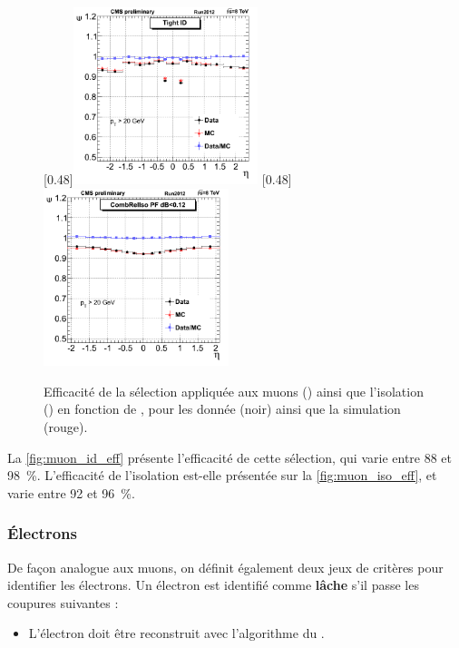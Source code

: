 \begin{figure}[tbp] \centering
    \subcaptionbox{\label{fig:muon_id_eff}}[0.48\textwidth]{\includegraphics[width=0.48\textwidth]{chapitre7/figs/muon_id_efficiency.png}} \hfill
    \subcaptionbox{\label{fig:muon_iso_eff}}[0.48\textwidth]{\includegraphics[width=0.48\textwidth]{chapitre7/figs/muon_iso_efficiency.png}}
    \caption{Efficacité de la sélection appliquée aux muons () ainsi que l'isolation () en fonction de \aeta, pour les donnée (noir) ainsi que la simulation (rouge).}
\end{figure}

La \cref{fig:muon_id_eff} présente l'efficacité de cette sélection, qui varie entre \num{88} et \SI{98}{\%}. L'efficacité de l'isolation est-elle présentée sur la \cref{fig:muon_iso_eff}, et varie entre \num{92} et \SI{96}{\%}.

\subsubsection{Électrons} \label{sec:sel_electron}


De façon analogue aux muons, on définit également deux jeux de critères pour identifier les électrons. Un électron est identifié comme \textbf{lâche} s'il passe les coupures suivantes :
\begin{itemize}
  \item L'électron doit être reconstruit avec l'algorithme du \pf.
\end{itemize}

